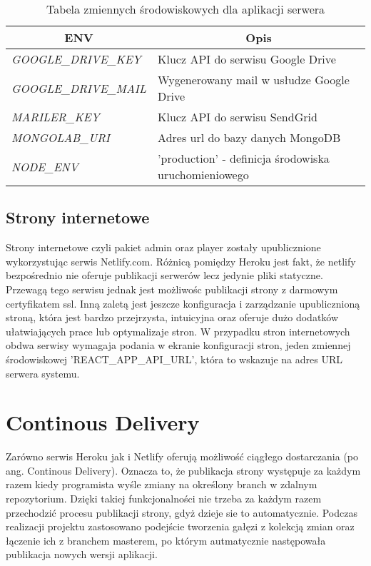 \begin{table}[h!]
\centering
\begin{tabular}{|l|l|}
\hline
\multicolumn{1}{|c|}{\textbf{ENV}} & \multicolumn{1}{c|}{\textbf{Opis}} \\ \hline
\textit{GOOGLE\_DRIVE\_KEY} & Klucz API do serwisu Google Drive \\ \hline
\textit{GOOGLE\_DRIVE\_MAIL} & Wygenerowany mail w usłudze Google Drive \\ \hline
\textit{MARILER\_KEY} & Klucz API do serwisu SendGrid \\ \hline
\textit{MONGOLAB\_URI} & Adres url do bazy danych MongoDB \\ \hline
\textit{NODE\_ENV} & 'production' - definicja środowiska uruchomieniowego \\ \hline
\end{tabular}
\caption{Tabela zmiennych środowiskowych dla aplikacji serwera}
\end{table}

\subsection{Strony internetowe}
Strony internetowe czyli pakiet admin oraz player zostały upublicznione wykorzystując serwis Netlify.com. Różnicą pomiędzy Heroku jest fakt, że netlify bezpośrednio nie oferuje publikacji serwerów lecz jedynie pliki statyczne. Przewagą tego serwisu jednak jest możliwośc publikacji strony z darmowym certyfikatem ssl. Inną zaletą jest jeszcze konfiguracja i zarządzanie upublicznioną stroną, która jest bardzo przejrzysta, intuicyjna oraz oferuje dużo dodatków ułatwiających prace lub optymalizaje stron. W przypadku stron internetowych obdwa serwisy wymagaja podania w ekranie konfiguracji stron, jeden zmiennej środowiskowej 'REACT\_APP\_API\_URL', która to wskazuje na adres URL serwera systemu.

\section{Continous Delivery}
Zarówno serwis Heroku jak i Netlify oferują możliwość ciągłego dostarczania (po ang. Continous Delivery). Oznacza to, że publikacja strony występuje za każdym razem kiedy programista wyśle zmiany na określony branch w zdalnym repozytorium. Dzięki takiej funkcjonalności nie trzeba za każdym razem przechodzić procesu publikacji strony, gdyż dzieje sie to automatycznie. Podczas realizacji projektu zastosowano podejście tworzenia gałęzi z kolekcją zmian oraz łączenie ich z branchem masterem, po którym autmatycznie następowała publikacja nowych wersji aplikacji.